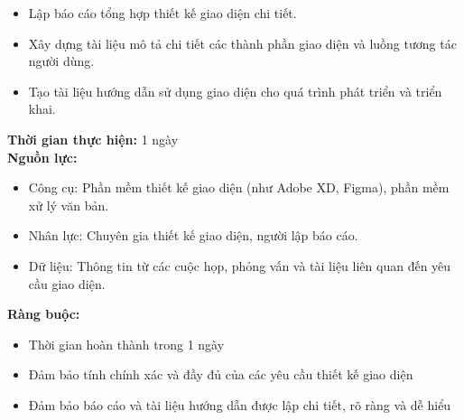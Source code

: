 {\begin{minipage}{\textwidth}
\begin{itemize}
        \item Lập báo cáo tổng hợp thiết kế giao diện chi tiết.
        \item Xây dựng tài liệu mô tả chi tiết các thành phần giao diện và luồng tương tác người dùng.
        \item Tạo tài liệu hướng dẫn sử dụng giao diện cho quá trình phát triển và triển khai.
    \end{itemize}
    \noindent \textbf{Thời gian thực hiện:} 1 ngày \\
    \noindent \textbf{Nguồn lực:}
    \begin{itemize}
        \item Công cụ: Phần mềm thiết kế giao diện (như Adobe XD, Figma), phần mềm xử lý văn bản.
        \item Nhân lực: Chuyên gia thiết kế giao diện, người lập báo cáo.
        \item Dữ liệu: Thông tin từ các cuộc họp, phỏng vấn và tài liệu liên quan đến yêu cầu giao diện.
    \end{itemize}
    \noindent \textbf{Ràng buộc:}
    \begin{itemize}
        \item Thời gian hoàn thành trong 1 ngày
        \item Đảm bảo tính chính xác và đầy đủ của các yêu cầu thiết kế giao diện
        \item Đảm bảo báo cáo và tài liệu hướng dẫn được lập chi tiết, rõ ràng và dễ hiểu
    \end{itemize}
    \end{minipage}
}
\newpage
{}    
